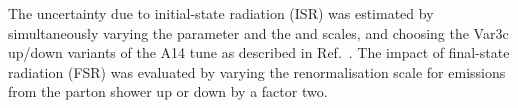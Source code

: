 The uncertainty due to initial-state radiation (ISR) was estimated by
simultaneously varying the \hdamp parameter and the \muR and
\muF scales, and choosing the Var3c up/down variants of the A14 tune
as described in Ref.~\cite{ATL-PHYS-PUB-2017-007}. The impact of
final-state radiation (FSR) was evaluated by varying the renormalisation scale 
for emissions from the parton shower up or down by a factor two.
